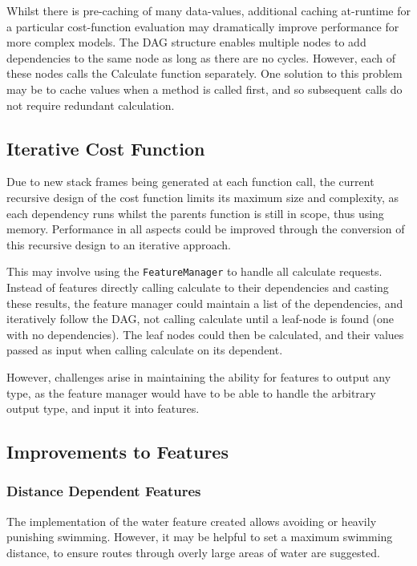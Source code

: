 \documentclass[12pt]{article}
\begin{document}
Whilst there is pre-caching of many data-values, additional caching at-runtime for a particular cost-function evaluation may dramatically improve performance for more complex models. The DAG structure enables multiple nodes to add dependencies to the same node as long as there are no cycles. However, each of these nodes calls the Calculate function separately. One solution to this problem may be to cache values when a method is called first, and so subsequent calls do not require redundant calculation.

\subsection{Iterative Cost Function}

Due to new stack frames being generated at each function call, the current recursive design of the cost function limits its maximum size and complexity, as each dependency runs whilst the parents function is still in scope, thus using memory. Performance in all aspects could be improved through the conversion of this recursive design to an iterative approach.

This may involve using the \texttt{FeatureManager} to handle all calculate requests. Instead of features directly calling calculate to their dependencies and casting these results, the feature manager could maintain a list of the dependencies, and iteratively follow the DAG, not calling calculate until a leaf-node is found (one with no dependencies). The leaf nodes could then be calculated, and their values passed as input when calling calculate on its dependent.

However, challenges arise in maintaining the ability for features to output any type, as the feature manager would have to be able to handle the arbitrary output type, and input it into features.

\subsection{Improvements to Features}

\subsubsection{Distance Dependent Features}

The implementation of the water feature created allows avoiding or heavily punishing swimming. However, it may be helpful to set a maximum swimming distance, to ensure routes through overly large areas of water are suggested.
\end{document}
